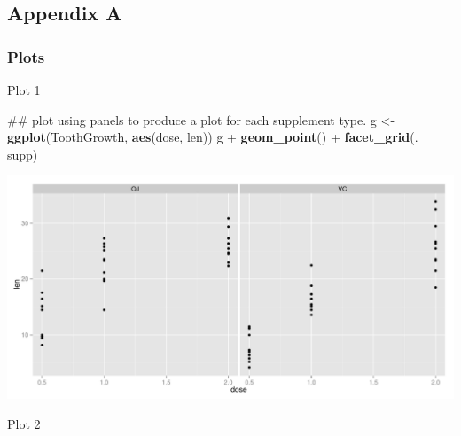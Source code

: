 \documentclass[]{article}
\newenvironment{Shaded}{\begin{snugshade}}{\end{snugshade}}
\newcommand{\KeywordTok}[1]{\textcolor[rgb]{0.13,0.29,0.53}{\textbf{{#1}}}}
\newcommand{\StringTok}[1]{\textcolor[rgb]{0.31,0.60,0.02}{{#1}}}
\newcommand{\NormalTok}[1]{{#1}}
\begin{document}
\subsection{Appendix A}\label{appendix-a}

\subsubsection{Plots}\label{plots}

Plot 1

\begin{Shaded}
\begin{Highlighting}[]
\NormalTok{## plot using panels to produce a plot for each supplement type.}
\NormalTok{g <-}\StringTok{ }\KeywordTok{ggplot}\NormalTok{(ToothGrowth, }\KeywordTok{aes}\NormalTok{(dose, len))}
\NormalTok{g +}\StringTok{ }\KeywordTok{geom_point}\NormalTok{() +}\StringTok{ }\KeywordTok{facet_grid}\NormalTok{(. ~}\StringTok{ }\NormalTok{supp)}
\end{Highlighting}
\end{Shaded}

\includegraphics{BMT_project2_for_submission_20-04-2015_files/figure-latex/Quick simple plot-1.pdf}

Plot 2
\end{document}
